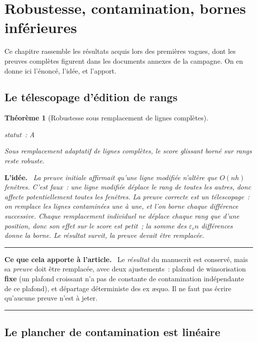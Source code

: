 \documentclass[11pt]{article}
\theoremstyle{plain}
\newtheorem{theoreme}{Théorème}[section]
\theoremstyle{definition}
\theoremstyle{remark}
\newcommand{\1}{\mathbf 1}
\newcommand{\statut}[1]{%
  \nopagebreak\par\nopagebreak
  \hfill{\normalfont\footnotesize\textcolor{gris}{statut~: #1}}%
  \par\nopagebreak\vspace{-2pt}}
\newenvironment{idee}
  {\par\medskip\noindent\textcolor{bleu}{\textbf{L'idée.}}\ \itshape}
  {\par\medskip}
\newenvironment{apport}
  {\par\medskip\noindent\begingroup\color{bleu}\rule{\linewidth}{0.6pt}\par
   \nobreak\vspace{2pt}\noindent\textbf{Ce que cela apporte à l'article.}\ \normalcolor}
  {\par\vspace{2pt}\noindent\textcolor{bleu}{\rule{\linewidth}{0.6pt}}\endgroup\par\medskip}
\begin{document}
\clearpage

\section{Robustesse, contamination, bornes inférieures}\label{ch:robust}

Ce chapitre rassemble les résultats acquis lors des premières vagues, dont
les preuves complètes figurent dans les documents annexes de la campagne.
On en donne ici l'énoncé, l'idée, et l'apport.

\subsection{Le télescopage d'édition de rangs}

\begin{theoreme}[Robustesse sous remplacement de lignes complètes]
\label{thm:telescopage}
\statut{A}
Sous remplacement adaptatif de lignes complètes, le score glissant borné
sur rangs reste robuste.
\end{theoreme}

\begin{idee}
La preuve initiale affirmait qu'une ligne modifiée n'altère que $O(nh)$
fenêtres. C'est faux~: une ligne modifiée déplace le rang de \emph{toutes}
les autres, donc affecte potentiellement toutes les fenêtres. La preuve
correcte est un \emph{télescopage}~: on remplace les lignes contaminées
une à une, et l'on borne chaque différence successive. Chaque
remplacement individuel ne déplace chaque rang que d'une position, donc
son effet sur le score est petit~; la somme des $\varepsilon_cn$
différences donne la borne. Le résultat survit, la preuve devait être
remplacée.
\end{idee}

\begin{apport}
Le \emph{résultat} du manuscrit est conservé, mais sa \emph{preuve} doit
être remplacée, avec deux ajustements~: plafond de winsorisation
\textbf{fixe} (un plafond croissant n'a pas de constante de contamination
indépendante de ce plafond), et départage déterministe des ex æquo. Il ne
faut pas écrire qu'aucune preuve n'est à jeter.
\end{apport}

\subsection{Le plancher de contamination est linéaire}
\end{document}
